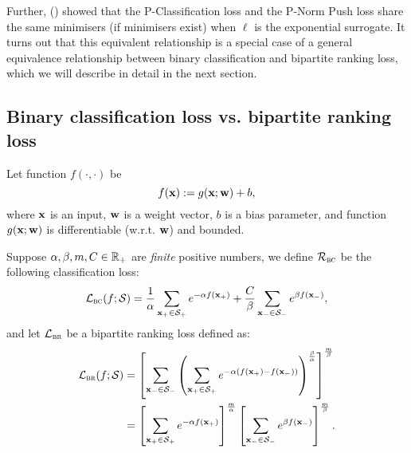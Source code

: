 Further, (\cite{ertekin2011equivalence}) showed that the P-Classification loss and the P-Norm Push loss share the same minimisers
(if minimisers exist) when $\ell$ is the exponential surrogate.
It turns out that this equivalent relationship is a special case of a general equivalence relationship 
between binary classification and bipartite ranking loss, which we will describe in detail in the next section.



\subsection{Binary classification loss vs. bipartite ranking loss}

Let function $f(\cdot, \cdot)$ be
$$
f(\mathbf{x}) := g(\mathbf{x}; \mathbf{w}) + b,
$$
where $\mathbf{x}$ is an input, $\mathbf{w}$ is a weight vector, $b$ is a bias parameter, 
and function $g(\mathbf{x}; \mathbf{w})$ is differentiable (w.r.t. $\mathbf{w}$) and bounded.

Suppose $\alpha, \beta, m, C \in \mathbb{R}_+$ are \emph{finite} positive numbers, we define 
$\mathcal{R}_\textsc{bc}$ be the following classification loss:
\begin{equation*}
\mathcal{L}_\textsc{bc}(f; \mathcal{S})
= \displaystyle 
  \frac{1}{\alpha} \sum_{\mathbf{x}_+ \in \mathcal{S}_+} e^{-\alpha f(\mathbf{x}_+)} +
  \frac{C}{\beta}  \sum_{\mathbf{x}_- \in \mathcal{S}_-} e^{ \beta  f(\mathbf{x}_-)},
\end{equation*}
and let
$\mathcal{L}_\textsc{br}$ be a bipartite ranking loss defined as:
\begin{equation*}
\begin{aligned}
\mathcal{L}_\textsc{br}(f; \mathcal{S})
&= \left[ \displaystyle 
   \sum_{\mathbf{x}_- \in \mathcal{S}_-} \left( \sum_{\mathbf{x}_+ \in \mathcal{S}_+} e^{-\alpha (f(\mathbf{x}_+) - f(\mathbf{x}_-))} \right)^\frac{\beta}{\alpha}
   \right]^\frac{m}{\beta} \\
&= \left[ \sum_{\mathbf{x}_+ \in \mathcal{S}_+} e^{-\alpha f(\mathbf{x}_+)} \right]^\frac{m}{\alpha}
   \left[ \sum_{\mathbf{x}_- \in \mathcal{S}_-} e^{ \beta  f(\mathbf{x}_-)} \right]^\frac{m}{\beta}.
\end{aligned}
\end{equation*}


